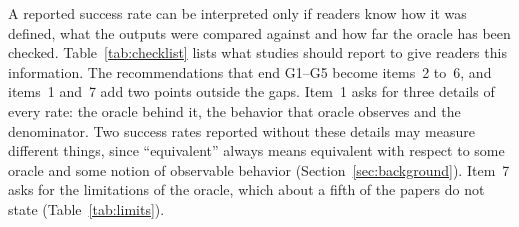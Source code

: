 \begin{added}
A reported success rate can be interpreted only if readers know how it was defined, what the outputs were compared against and how far the oracle has been checked. Table~\ref{tab:checklist} lists what studies should report to give readers this information. The recommendations that end G1--G5 become items~2 to~6, and items~1 and~7 add two points outside the gaps. Item~1 asks for three details of every rate: the oracle behind it, the behavior that oracle observes and the denominator. Two success rates reported without these details may measure different things, since ``equivalent'' always means equivalent with respect to some oracle and some notion of observable behavior (Section~\ref{sec:background}). Item~7 asks for the limitations of the oracle, which about a fifth of the papers do not state (Table~\ref{tab:limits}).


\end{added}
